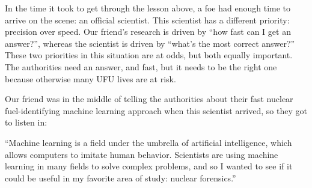 {\begin{shadequote}

  In the time it took to get through the lesson above, a foe had enough time to
  arrive on the scene: an official scientist. This scientist has a different
  priority: precision over speed. Our friend's research is driven by ``how fast
  can I get an answer?'', whereas the scientist is driven by ``what's the most
  correct answer?'' These two priorities in this situation are at odds, but both
  equally important. The authorities need an answer, and fast, but it needs to
  be the right one because otherwise many UFU lives are at risk.
  
  Our friend was in the middle of telling the authorities about their fast
  nuclear fuel-identifying machine learning approach when this scientist
  arrived, so they got to listen in:
  
  ``Machine learning is a field under the umbrella of artificial intelligence,
  which allows computers to imitate human behavior. Scientists are using
  machine learning in many fields to solve complex problems, and so I wanted to
  see if it could be useful in my favorite area of study: nuclear forensics.''
  
\end{shadequote}

}
